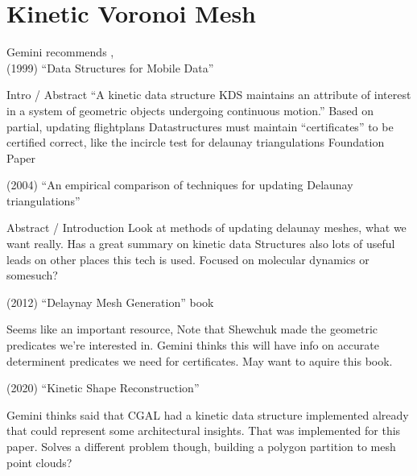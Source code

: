 \section{Kinetic Voronoi Mesh}

Gemini recommends \cite{basch1999data},\\
(1999) ``Data Structures for Mobile Data''
\begin{outline}
\1 Intro / Abstract
\2 ``A kinetic data structure KDS maintains an attribute of interest in a system of
geometric objects undergoing continuous motion.''
\2 Based on partial, updating flightplans
\2 Datastructures must maintain ``certificates'' to be certified correct, like the incircle test for delaunay triangulations
\2 Foundation Paper
\end{outline}

(2004) ``An empirical comparison of techniques for updating Delaunay
triangulations'' \cite{guibas2004empirical}
\begin{outline}
\1 Abstract / Introduction
\2 Look at methods of updating delaunay meshes, what we want really.
\2 Has a great summary on kinetic data Structures 
\2 also lots of useful leads on other places this tech is used.
\2 Focused on molecular dynamics or somesuch?
\end{outline}

(2012) ``Delaynay Mesh Generation'' book
\begin{outline} \cite{cheng2013delaunay}
\1 Seems like an important resource, Note that Shewchuk made the geometric predicates we're interested in.
\1 Gemini thinks this will have info on accurate determinent predicates we need for certificates.
\1 May want to aquire this book.
\end{outline}

(2020) ``Kinetic Shape Reconstruction'' \cite{Bauchet2020kin}
\begin{outline}
\1 Gemini thinks said that CGAL had a kinetic data structure implemented already that could represent some architectural insights. 
\2 That was implemented for this paper.
\2 Solves a different problem though, building a polygon partition to mesh point clouds?
\end{outline}


